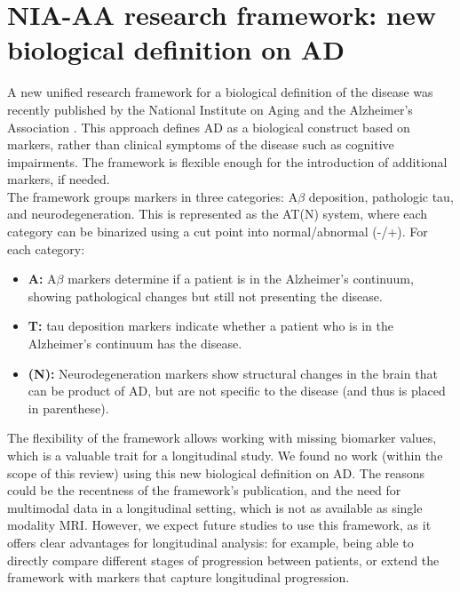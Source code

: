\section{NIA-AA research framework: new biological definition on AD}
\label{nia}

A new unified research framework for a biological definition of the disease was recently published by the National Institute on Aging and the Alzheimer's Association \cite{Jack2018}. This approach defines AD as a biological construct based on markers, rather than clinical symptoms of the disease such as cognitive impairments. The framework is flexible enough for the introduction of additional markers, if needed. \\

The framework groups markers in three categories: A$\beta$ deposition, pathologic tau, and neurodegeneration. This is represented as the AT(N) system, where each category can be binarized using a cut point into normal/abnormal (-/+). For each category:

\begin{itemize}
    \item \textbf{A:} A$\beta$ markers determine if a patient is in the Alzheimer's continuum, showing pathological changes but still not presenting the disease.
    \item \textbf{T:} tau deposition markers indicate whether a patient who is in the Alzheimer's continuum has the disease.
    \item \textbf{(N):} Neurodegeneration markers show structural changes in the brain that can be product of AD, but are not specific to the disease (and thus is placed in parenthese).
\end{itemize}

The flexibility of the framework allows working with missing biomarker values, which is a valuable trait for a longitudinal study. We found no work (within the scope of this review) using this new biological definition on AD. The reasons could be the recentness of the framework's publication, and the need for multimodal data in a longitudinal setting, which is not as available as single modality MRI. However, we expect future studies to use this framework, as it offers clear advantages for longitudinal analysis: for example, being able to directly compare different stages of progression between patients, or extend the framework with markers that capture longitudinal progression.

